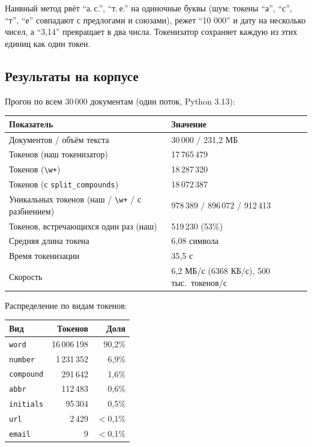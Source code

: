 Наивный метод рвёт \enquote{а.\,с.}, \enquote{т.\,е.} на одиночные буквы (шум: токены
\enquote{а}, \enquote{с}, \enquote{т}, \enquote{е} совпадают с предлогами и союзами),
режет \enquote{10 000} и дату на несколько чисел, а \enquote{3,14} превращает в
два числа. Токенизатор сохраняет каждую из этих единиц как один токен.

\subsection{Результаты на корпусе}
Прогон по всем 30\,000 документам (один поток, Python 3.13):

\begin{longtable}{|p{8.2cm}|p{6.1cm}|}
\hline
\textbf{Показатель} & \textbf{Значение} \\ \hline
Документов / объём текста & 30\,000 / 231{,}2 МБ \\ \hline
Токенов (наш токенизатор) & 17\,765\,479 \\ \hline
Токенов (\texttt{\textbackslash w+}) & 18\,287\,320 \\ \hline
Токенов (с \texttt{split\_}\allowbreak\texttt{compounds}) & 18\,072\,387 \\ \hline
Уникальных токенов (наш / \texttt{\textbackslash w+} / с разбиением) & 978\,389 / 896\,072 / 912\,413 \\ \hline
Токенов, встречающихся один раз (наш) & 519\,230 (53\%) \\ \hline
Средняя длина токена & 6{,}08 символа \\ \hline
Время токенизации & 35{,}5 с \\ \hline
Скорость & 6{,}2 МБ/с (6368 КБ/с), 500\,тыс.\ токенов/с \\ \hline
\end{longtable}

Распределение по видам токенов:

\begin{longtable}{|l|r|r|}
\hline
\textbf{Вид} & \textbf{Токенов} & \textbf{Доля} \\ \hline
\texttt{word} & 16\,006\,198 & 90{,}2\% \\ \hline
\texttt{number} & 1\,231\,352 & 6{,}9\% \\ \hline
\texttt{compound} & 291\,642 & 1{,}6\% \\ \hline
\texttt{abbr} & 112\,483 & 0{,}6\% \\ \hline
\texttt{initials} & 95\,304 & 0{,}5\% \\ \hline
\texttt{url} & 2\,429 & $<$0{,}1\% \\ \hline
\texttt{email} & 9 & $<$0{,}1\% \\ \hline
\end{longtable}

